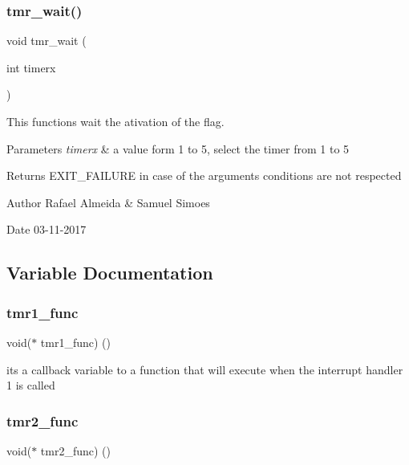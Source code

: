 \subsubsection{tmr\+\_\+wait()}
{\footnotesize\ttfamily void tmr\+\_\+wait (\begin{DoxyParamCaption}\item[{int}]{timerx }\end{DoxyParamCaption})}



This functions wait the ativation of the flag. 


\begin{DoxyParams}{Parameters}
{\em timerx} & a value form 1 to 5, select the timer from 1 to 5\\
\hline
\end{DoxyParams}
\begin{DoxyReturn}{Returns}
E\+X\+I\+T\+\_\+\+F\+A\+I\+L\+U\+RE in case of the argument\textquotesingle{}s conditions are not respected 
\end{DoxyReturn}
\begin{DoxyAuthor}{Author}
Rafael Almeida \& Samuel Simoes 
\end{DoxyAuthor}
\begin{DoxyDate}{Date}
03-\/11-\/2017 
\end{DoxyDate}


\subsection{Variable Documentation}
\mbox{\label{_timer__libs_8c_a20150e614e0db063b5a978ffa74ec1f3}} 
\subsubsection{tmr1\+\_\+func}
{\footnotesize\ttfamily void($\ast$ tmr1\+\_\+func) ()}

it\textquotesingle{}s a callback variable to a function that will execute when the interrupt handler 1 is called \mbox{\label{_timer__libs_8c_a32d642fb3357fd7c99dafad4f17885e8}} 
\subsubsection{tmr2\+\_\+func}
{\footnotesize\ttfamily void($\ast$ tmr2\+\_\+func) ()}

